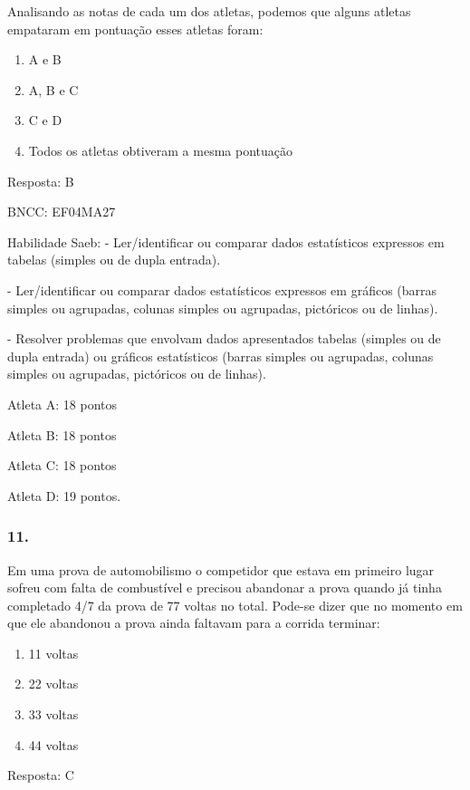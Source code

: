 Analisando as notas de cada um dos atletas, podemos que alguns atletas
empataram em pontuação esses atletas foram:

\begin{enumerate}
\def\labelenumi{\alph{enumi})}
\item
  A e B
\item
  A, B e C
\item
  C e D
\item
  Todos os atletas obtiveram a mesma pontuação
\end{enumerate}

Resposta: B

BNCC: EF04MA27

Habilidade Saeb: - Ler/identificar ou comparar dados estatísticos
expressos em tabelas (simples ou de dupla entrada).

- Ler/identificar ou comparar dados estatísticos expressos em gráficos
(barras simples ou agrupadas, colunas simples ou agrupadas, pictóricos
ou de linhas).

- Resolver problemas que envolvam dados apresentados tabelas (simples ou
de dupla entrada) ou gráficos estatísticos (barras simples ou agrupadas,
colunas simples ou agrupadas, pictóricos ou de linhas).

Atleta A: 18 pontos

Atleta B: 18 pontos

Atleta C: 18 pontos

Atleta D: 19 pontos.

\subsubsection{11.}\label{section-197}

Em uma prova de automobilismo o competidor que estava em primeiro lugar
sofreu com falta de combustível e precisou abandonar a prova quando já
tinha completado 4/7 da prova de 77 voltas no total. Pode-se dizer que
no momento em que ele abandonou a prova ainda faltavam para a corrida
terminar:

\begin{enumerate}
\def\labelenumi{\alph{enumi})}
\item
  11 voltas
\item
  22 voltas
\item
  33 voltas
\item
  44 voltas
\end{enumerate}

Resposta: C

